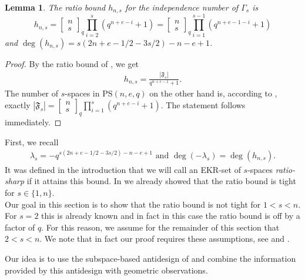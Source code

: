 \documentclass[11pt]{article}
\newtheorem{lemma}[thm]{Lemma}
\newcommand{\Gauss}[2]{{\begin{bmatrix} #1 \\ #2 \end{bmatrix}_q}}
\newcommand{\PS}{\mathrm{PS}}
\newcommand{\cF}{\mathfrak{F}}
\begin{document}
\begin{lemma} \label{C: ratio bound (s)}
	The ratio bound $h_{n,s}$ for the independence number of $\Gamma_s$ is 
	$$h_{n,s}= \Gauss{n}{s} \prod\limits_{i=2}^s (q^{n+e-i}+1) =\Gauss{n}{s} \prod\limits_{i=1}^{s-1} (q^{n+e-1-i}+1)$$
 and $\deg(h_{n,s})=s(2n+e-1/2-3s/2)-n-e+1$.
\end{lemma}
\begin{proof}
    By the ratio bound of , we get 
    \begin{align*}
        h_{n,s}=\frac{|\cF_s|}{q^{n+e-1}+1}.
    \end{align*}
    The number of $s$-spaces in $\PS(n,e,q)$ on the other hand is, according to , exactly $|\cF_s|=\Gauss{n}{s}\prod\limits_{i=1}^s(q^{n+e-i}+1)$. The statement follows immediately.
\end{proof}

First, we recall
\begin{align*}
    \lambda_s=  -q^{s(2n+e-1/2-3s/2)-n-e+1} \text{\ and  } \deg(-\lambda_s)=\deg(h_{n,s}).
\end{align*}
It was defined in the introduction that we will call an EKR-set of $s$-spaces \textit{ratio-sharp} if it attains this bound.
In  we already showed that the ratio bound is tight for $s\in \{1,n \}$.\\

Our goal in this section is to show that the ratio bound is not tight for $1<s<n$. For $s=2$ this is already known \cite{metsch_pairwise-non-opp-lines} and in fact in this case the ratio bound is off by a factor of $q$. 
For this reason, we assume for the remainder of this section that $2 < s < n$. We note that in fact our proof requires these assumptions, see  and .

Our idea is to use the subspace-based antidesign of  and combine the information provided by this antidesign with geometric observations.  
\end{document}
